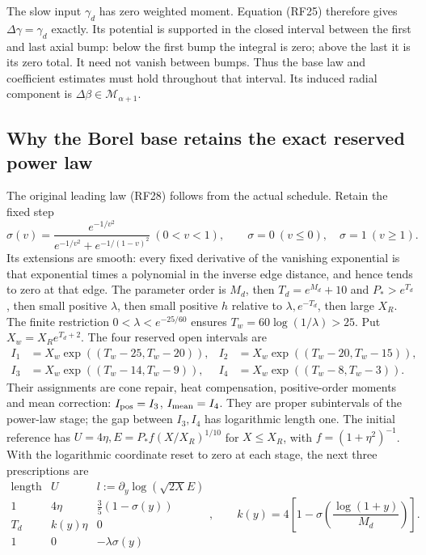 \documentclass[10pt,a4paper]{article}
\begin{document}
The slow input \(\gamma_d\) has zero weighted moment. Equation
(RF25) therefore gives \(\Delta\gamma=\gamma_d\) exactly.
Its potential is supported in the closed interval between the first
and last axial bump: below the first bump the integral is zero; above
the last it is its zero total. It need not vanish between bumps.
Thus the base law and coefficient estimates must hold throughout that
interval. Its induced radial component is
\(\Delta\beta\in\mathcal M_{\alpha+1}\).

\subsection{Why the Borel base retains the exact reserved power law}

The original leading law (RF28) follows from the actual schedule.
Retain the fixed step
\[
\sigma(v)=\frac{e^{-1/v^2}}{e^{-1/v^2}+e^{-1/(1-v)^2}}
\ (0<v<1),\qquad \sigma=0\ (v\le0),\quad \sigma=1\ (v\ge1).
\]
Its extensions are smooth: every fixed derivative of the vanishing
exponential is that exponential times a polynomial in the inverse
edge distance, and hence tends to zero at that edge.
The parameter order is \(M_d\), then \(T_d=e^{M_d}+10\) and
\(P_*>e^{T_d}\), then small positive \(\lambda\), then small positive
\(h\) relative to \(\lambda,e^{-T_d}\), then large \(X_R\).
The finite restriction \(0<\lambda<e^{-25/60}\) ensures
\(T_w=60\log(1/\lambda)>25\). Put \(X_w=X_Re^{T_d+2}\).
The four reserved open intervals are
\[
\begin{aligned}
I_1&=X_w\exp((T_w-25,T_w-20)),&
I_2&=X_w\exp((T_w-20,T_w-15)),\\
I_3&=X_w\exp((T_w-14,T_w-9)),&
I_4&=X_w\exp((T_w-8,T_w-3)).
\end{aligned}
\tag{RF40a}
\]
Their assignments are cone repair, heat compensation, positive-order
moments and mean correction: \(I_{\rm pos}=I_3\),
\(I_{\rm mean}=I_4\). They are proper subintervals of the power-law
stage; the gap between \(I_3,I_4\) has logarithmic length one.
The initial reference has \(U=4\eta,E=P_*f(X/X_R)^{1/10}\) for
\(X\le X_R\), with \(f=(1+\eta^2)^{-1}\). With the logarithmic
coordinate reset to zero at each stage, the next three prescriptions
are
\[
\begin{array}{c|c|c}
\text{length}&U&l:=\partial_y\log(\sqrt{2X}E)\\ \hline
1&4\eta&\frac35(1-\sigma(y))\\
T_d&k(y)\eta&0\\
1&0&-\lambda\sigma(y)
\end{array}
,\qquad
k(y)=4\left[1-\sigma\left(\frac{\log(1+y)}{M_d}\right)\right].
\tag{RF40b}
\]
\end{document}
